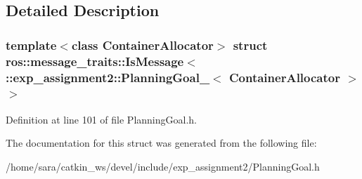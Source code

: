 \subsection{Detailed Description}
\subsubsection*{template$<$class Container\+Allocator$>$\newline
struct ros\+::message\+\_\+traits\+::\+Is\+Message$<$ \+::exp\+\_\+assignment2\+::\+Planning\+Goal\+\_\+$<$ Container\+Allocator $>$ $>$}



Definition at line 101 of file Planning\+Goal.\+h.



The documentation for this struct was generated from the following file\+:\begin{DoxyCompactItemize}
\item 
/home/sara/catkin\+\_\+ws/devel/include/exp\+\_\+assignment2/Planning\+Goal.\+h\end{DoxyCompactItemize}
